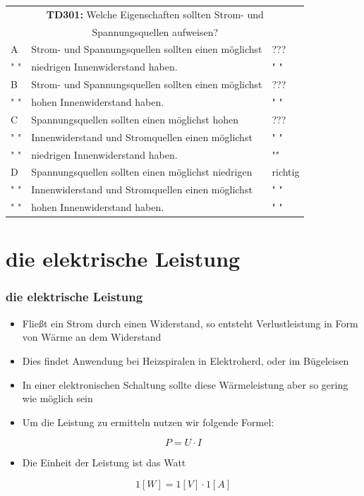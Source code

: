 \begin{frame}
	\begin{small}	
	\begin{tabular}{|l|l|l|}
	\hline
		\multicolumn{3}{|c|}{\textbf{TD301:} Welche Eigenschaften sollten Strom- und}\\
		\multicolumn{3}{|c|}{Spannungsquellen aufweisen?}\\
		\hline
		A &  Strom- und Spannungsquellen sollten einen möglichst  & ??? \\
		" " & niedrigen Innenwiderstand haben. & " "\\ \hline
		B &  Strom- und Spannungsquellen sollten einen möglichst  & ??? \\
		" " & hohen Innenwiderstand haben. & " "\\ \hline
		C & Spannungsquellen sollten einen möglichst hohen & ??? \\
		" " & Innenwiderstand und Stromquellen einen möglichst  & " " \\ 
		" " & niedrigen Innenwiderstand haben.  & "" \\ \hline
		D & Spannungsquellen sollten einen möglichst niedrigen & richtig \\
		" " & Innenwiderstand und Stromquellen einen möglichst & " " \\ 
		" " & hohen Innenwiderstand haben.  & " " \\ \hline 		
	\end{tabular}
	\end{small}
\end{frame}

\section{die elektrische Leistung}
\begin{frame}
	\frametitle{die elektrische Leistung}
	\begin{itemize}
		\item	Fließt ein Strom durch einen Widerstand, so entsteht Verlustleistung in Form von Wärme an dem Widerstand
		\item	Dies findet Anwendung bei Heizspiralen in Elektroherd, oder im Bügeleisen
		\item	In einer elektronischen Schaltung sollte diese Wärmeleistung aber so gering wie möglich sein
		\item	Um die Leistung zu ermitteln nutzen wir folgende Formel:
	\end{itemize}
	\begin{equation}
		P = U \cdot I
	\end{equation}
	\begin{itemize}
		\item	Die Einheit der Leistung ist das Watt
	\end{itemize}
	\begin{equation}
		 1[W] = 1[V] \cdot 1[A]
	\end{equation}
\end{frame}

